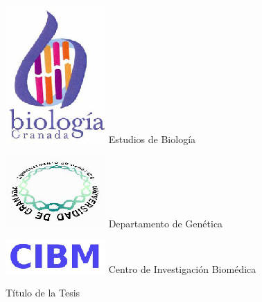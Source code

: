 \documentclass[b5paper,twoside,10pt]{book}
\begin{document}
\begin{minipage}[b]{.23\textwidth}
\centering
\includegraphics[width=.7\textwidth]{biologia}
Estudios de Biolog\'ia
\end{minipage}
\hfill
\begin{minipage}[b]{.23\textwidth}
\centering
\includegraphics[width=.7\textwidth]{genetica}
Departamento de Gen\'etica
\end{minipage}
\hfill
\begin{minipage}[b]{.23\textwidth}
\centering
\includegraphics[width=.7\textwidth]{cibm}
Centro de Investigaci\'on Biom\'edica
\end{minipage}
\vfill
\begin{center}
\LARGE
Título de la Tesis

\end{center}
\vfill
\end{document}
